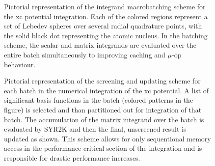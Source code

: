 \begin{figure}[t!]
\begin{center}
\end{center}
\caption{Pictorial representation of the integrand macrobatching scheme for the xc potential integration. 
Each of the colored regions represent a set of Lebedev spheres over several radial quadrature points, with the 
solid black dot representing the atomic nucleus. In the batching scheme, the scalar and matrix integrands
are evaluated over the entire batch simultaneously to improving caching and $\mu$-op behaviour.
}
\label{fig:Batching}       %
\end{figure}

\begin{figure}
\begin{center}
\end{center}
\caption{Pictorial representation of the screening and updating scheme for each
batch in the numerical integration of the xc potential.  A list of significant
basis functions in the batch (colored patterns in the figure) is selected and
than partitioned out for integration of that batch.  The accumulation of the
matrix integrand over the batch is evaluated by SYR2K  and then the final,
unscreened result is updated as shown. This scheme allows for only sequentional
memory access in the performance critical section of the integration and is
responsible for drastic performance increases.}
\label{fig:Integration}       %
\end{figure}

